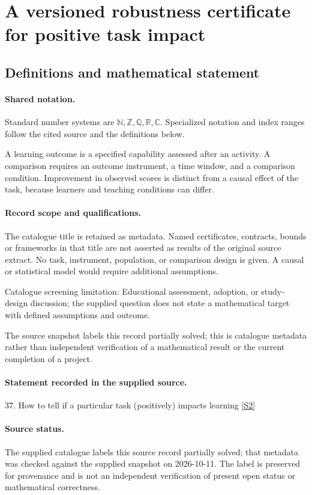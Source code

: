\documentclass[11pt]{article}
\newcommand{\sref}[2]{\hyperlink{source:#1:#2}{[S#2]}}
\begin{document}
\section{A versioned robustness certificate for positive task impact}\label{statement}

\subsection{Definitions and mathematical statement}

\paragraph{Shared notation.}Standard number systems are $\mathbb N,\mathbb Z,\mathbb Q,\mathbb R,\mathbb C$. Specialized notation and index ranges follow the cited source and the definitions below.


A learning outcome is a specified capability assessed after an activity. A comparison requires an outcome instrument, a time window, and a comparison condition. Improvement in observed scores is distinct from a causal effect of the task, because learners and teaching conditions can differ.
\paragraph{Record scope and qualifications.}
The catalogue title is retained as metadata. Named certificates, contracts, bounds or frameworks in that title are not asserted as results of the original source extract.
No task, instrument, population, or comparison design is given. A causal or statistical model would require additional assumptions.

Catalogue screening limitation: Educational assessment, adoption, or study-design discussion; the supplied question does not state a mathematical target with defined assumptions and outcome.

The source snapshot labels this record partially solved; this is catalogue metadata rather than independent verification of a mathematical result or the current completion of a project.
\paragraph{Statement recorded in the supplied source.}
37. How to tell if a particular task (positively) impacts learning \sref{statement}{2}
\paragraph{Source status.}
The supplied catalogue labels this source record partially solved; that metadata was checked against the supplied snapshot on 2026-10-11. The label is preserved for provenance and is not an independent verification of present open status or mathematical correctness.
\end{document}
